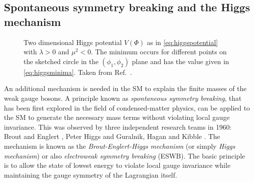 \subsection{Spontaneous symmetry breaking and the Higgs mechanism}
\label{sec:ewsymbreaking}






\begin{figure}
  \caption[Two dimensional Higgs potential $V(\Phi)$ with $\lambda > 0$ and $\mu^2 < 0$.]{Two dimensional Higgs potential $V(\Phi)$ as in \cref{eq:higgspotential} with $\lambda > 0$ and $\mu^2 < 0$. The minimum occurs for different points on the sketched circle in the $(\phi_1, \phi_2)$ plane and has the value given in \cref{eq:higgsminima}. Taken from Ref.~\cite{Halzen:1984mc}.
  }
  \label{fig:higgspotential}
\end{figure}

An additional mechanism is needed in the SM to explain the finite masses of the weak gauge bosons. 
A principle known as \emph{spontaneous symmetry breaking}, that has been first explored in the field of condensed-matter physics,  can be applied to the SM to generate the necessary mass terms without violating local gauge invariance.
This was observed by three independent research teams in 1960: Brout and Englert \cite{PhysRevLett.13.321}, Peter Higgs \cite{PhysRevLett.13.508,HIGGS1964132} and Guralnik, Hagan and Kibble \cite{PhysRevLett.13.585}.
The mechanism is known as the \emph{Brout-Englert-Higgs mechanism} (or simply \emph{Higgs mechanism}) or also \emph{electroweak symmetry breaking} (ESWB).
The basic principle is to allow the state of lowest energy to violate local gauge invariance while maintaining the gauge symmetry of the Lagrangian itself.

